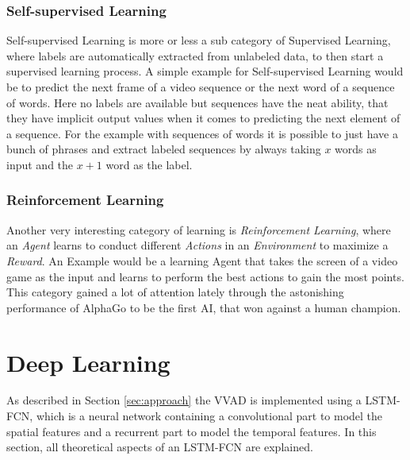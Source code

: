 \subsubsection{Self-supervised Learning}
Self-supervised Learning is more or less a sub category of Supervised Learning, where labels are automatically extracted from unlabeled data, to then start a supervised learning process. 
A simple example for Self-supervised Learning would be to predict the next frame of a video sequence or the next word of a sequence of words.
Here no labels are available but sequences have the neat ability, that they have implicit output values when it comes to predicting the next element of a sequence.
For the example with sequences of words it is possible to just have a bunch of phrases and extract labeled sequences by always taking $x$ words as input and the $x+1$ word as the label.


\subsubsection{Reinforcement Learning}
Another very interesting category of learning is \emph{Reinforcement Learning}, where an \emph{Agent} learns to conduct different \emph{Actions} in an \emph{Environment} to maximize a \emph{Reward}.
An Example would be a learning Agent that takes the screen of a video game as the input and learns to perform the best actions to gain the most points.
This category gained a lot of attention lately through the astonishing performance of AlphaGo \cite{AlphaGo} to be the first AI, that won against a human champion.


\section{Deep Learning}\label{sec:DeepLearning}
As described in Section \ref{sec:approach} the VVAD is implemented using a LSTM-FCN, which is a neural network containing a convolutional part to model the spatial features and a recurrent part to model the temporal features. 
In this section, all theoretical aspects of an LSTM-FCN are explained.
